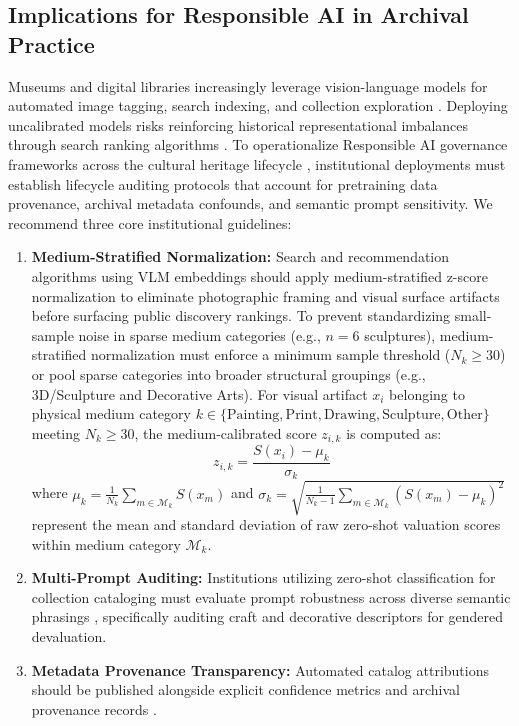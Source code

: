 \documentclass[pdflatex,sn-mathphys-num]{sn-jnl}%
\theoremstyle{thmstyleone}%
\theoremstyle{thmstyletwo}%
\theoremstyle{thmstylethree}%
\begin{document}
\subsection{Implications for Responsible AI in Archival Practice}
Museums and digital libraries increasingly leverage vision-language models for automated image tagging, search indexing, and collection exploration \cite{fiorucci2020machine, garcia2020bias}. Deploying uncalibrated models risks reinforcing historical representational imbalances through search ranking algorithms \cite{zhao2017men, bianchi2023easily}. To operationalize Responsible AI governance frameworks across the cultural heritage lifecycle \cite{dignum2019responsible, stahl2021responsible, jobin2019global, mitchell2019model}, institutional deployments must establish lifecycle auditing protocols that account for pretraining data provenance, archival metadata confounds, and semantic prompt sensitivity. We recommend three core institutional guidelines:
\begin{enumerate}
    \item \textbf{Medium-Stratified Normalization:} Search and recommendation algorithms using VLM embeddings should apply medium-stratified z-score normalization to eliminate photographic framing and visual surface artifacts before surfacing public discovery rankings. To prevent standardizing small-sample noise in sparse medium categories (e.g., $n=6$ sculptures), medium-stratified normalization must enforce a minimum sample threshold ($N_k \ge 30$) or pool sparse categories into broader structural groupings (e.g., 3D/Sculpture and Decorative Arts). For visual artifact $x_i$ belonging to physical medium category $k \in \{\text{Painting}, \text{Print}, \text{Drawing}, \text{Sculpture}, \text{Other}\}$ meeting $N_k \ge 30$, the medium-calibrated score $z_{i,k}$ is computed as:
    \begin{equation}
    z_{i,k} = \frac{S(x_i) - \mu_k}{\sigma_k}
    \end{equation}
    where $\mu_k = \frac{1}{N_k} \sum_{m \in \mathcal{M}_k} S(x_m)$ and $\sigma_k = \sqrt{\frac{1}{N_k - 1} \sum_{m \in \mathcal{M}_k} (S(x_m) - \mu_k)^2}$ represent the mean and standard deviation of raw zero-shot valuation scores within medium category $\mathcal{M}_k$.
    \item \textbf{Multi-Prompt Auditing:} Institutions utilizing zero-shot classification for collection cataloging must evaluate prompt robustness across diverse semantic phrasings \cite{steed2021image}, specifically auditing craft and decorative descriptors for gendered devaluation.
    \item \textbf{Metadata Provenance Transparency:} Automated catalog attributions should be published alongside explicit confidence metrics and archival provenance records \cite{mitchell2019model, dignum2019responsible, stahl2021responsible}.
\end{enumerate}
\end{document}
